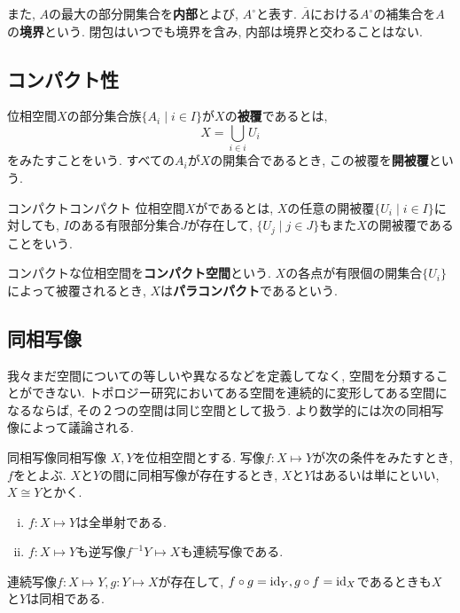 \documentclass[../main]{subfiles}
\begin{document}
        また, $A$の最大の部分開集合を\textbf{内部}とよび, $A^\circ$と表す. $\overline{A}$における$A^\circ$の補集合を$A$の\textbf{境界}という. 
        閉包はいつでも境界を含み, 内部は境界と交わることはない. 
        
    \subsection{コンパクト性}
        位相空間$X$の部分集合族$\{A_i \mid i \in I\}$が$X$の\textbf{被覆}であるとは, 
        \begin{equation}
            X = \bigcup_{i \in i}U_i 
        \end{equation}
        をみたすことをいう. すべての$A_i$が$X$の開集合であるとき, この被覆を\textbf{開被覆}という. 
        \begin{dfn}{コンパクト}{コンパクト}
            位相空間$X$がであるとは, $X$の任意の開被覆$\{U_i \mid i \in I\}$に対しても, $I$のある有限部分集合$J$が存在して, $\{U_j \mid j \in J\}$もまた$X$の開被覆であることをいう. 
        \end{dfn}
        コンパクトな位相空間を\textbf{コンパクト空間}という. $X$の各点が有限個の開集合$\{U_i\}$によって被覆されるとき, $X$は\textbf{パラコンパクト}であるという. 
        
    \subsection{同相写像}
        我々まだ空間についての等しいや異なるなどを定義してなく, 空間を分類することができない. トポロジー研究においてある空間を連続的に変形してある空間になるならば, その２つの空間は同じ空間として扱う. より数学的には次の同相写像によって議論される. 
        \begin{dfn}{同相写像}{同相写像}
            $X,Y$を位相空間とする. 写像$f:X \mapsto Y$が次の条件をみたすとき, $f$をとよぶ. $X$と$Y$の間に同相写像が存在するとき, $X$と$Y$はあるいは単にといい, $X \cong Y$とかく.  
            \begin{enumerate}[(i)]
                \item $f:X \mapsto Y$は全単射である. 
                \item $f:X \mapsto Y$も逆写像$f^{-1}Y \mapsto X$も連続写像である. 
            \end{enumerate}
        \end{dfn}
        連続写像$f:X \mapsto Y, g:Y \mapsto X$が存在して, $f \circ g = \operatorname{id}_Y, g \circ f = \operatorname{id}_X$であるときも$X$と$Y$は同相である. 
        
\end{document}
